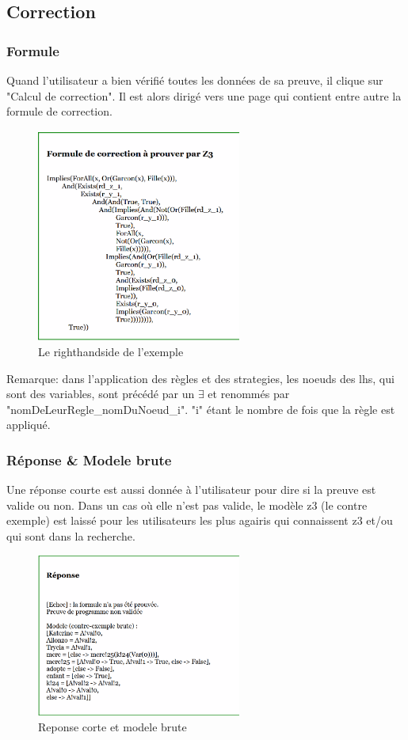 \documentclass[11pt,a4paper]{article}
\begin{document}
\subsection{Correction}
\subsubsection{Formule}
Quand l'utilisateur a bien vérifié toutes les données de sa preuve, il clique sur "Calcul de correction". Il est alors dirigé vers une page qui contient entre autre la formule de correction.
\begin{figure}[htbp]
  \centering
  \includegraphics[width=0.6\textwidth]{screen111.png}
  \caption{Le righthandside de l'exemple}
  \label{fig:mon_image}
\end{figure}

Remarque: dans l'application des règles et des strategies, les noeuds des lhs, qui sont des variables, sont précédé par un  $\exists$ et renommés par "nomDeLeurRegle\_nomDuNoeud\_i". "i" étant le nombre de fois que la règle est appliqué.

\subsubsection{Réponse \& Modele brute}
Une réponse courte est aussi donnée à l'utilisateur pour dire si la preuve est valide ou non. Dans un cas où elle n'est pas valide, le modèle z3 (le contre exemple) est laissé pour les utilisateurs les plus agairis qui connaissent z3 et/ou qui sont dans la recherche.
\begin{figure}[htbp]
  \centering
  \includegraphics[width=0.6\textwidth]{sceen112.png}
  \caption{Reponse corte et modele brute}
  \label{fig:mon_image}
\end{figure}
\end{document}
